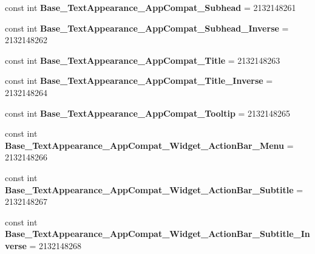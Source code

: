 \begin{DoxyCompactItemize}
\item 
\mbox{\label{classst_delivery_1_1_resource_1_1_style_a3ba1072d264f915f2ea480c4ac3f2675}} 
const int {\bfseries Base\+\_\+\+Text\+Appearance\+\_\+\+App\+Compat\+\_\+\+Subhead} = 2132148261
\item 
\mbox{\label{classst_delivery_1_1_resource_1_1_style_a83b7cdc42b468c067ec33a2ffac72bf6}} 
const int {\bfseries Base\+\_\+\+Text\+Appearance\+\_\+\+App\+Compat\+\_\+\+Subhead\+\_\+\+Inverse} = 2132148262
\item 
\mbox{\label{classst_delivery_1_1_resource_1_1_style_abcdab33e3cb05f960edd09c7cab39b3c}} 
const int {\bfseries Base\+\_\+\+Text\+Appearance\+\_\+\+App\+Compat\+\_\+\+Title} = 2132148263
\item 
\mbox{\label{classst_delivery_1_1_resource_1_1_style_a47932e3ee2c2fb7391d905f6e9c0e5da}} 
const int {\bfseries Base\+\_\+\+Text\+Appearance\+\_\+\+App\+Compat\+\_\+\+Title\+\_\+\+Inverse} = 2132148264
\item 
\mbox{\label{classst_delivery_1_1_resource_1_1_style_ae08ca5dc37900e68fa0c636225299f37}} 
const int {\bfseries Base\+\_\+\+Text\+Appearance\+\_\+\+App\+Compat\+\_\+\+Tooltip} = 2132148265
\item 
\mbox{\label{classst_delivery_1_1_resource_1_1_style_afb14513fed2de20cdc83cb8284a8b4a3}} 
const int {\bfseries Base\+\_\+\+Text\+Appearance\+\_\+\+App\+Compat\+\_\+\+Widget\+\_\+\+Action\+Bar\+\_\+\+Menu} = 2132148266
\item 
\mbox{\label{classst_delivery_1_1_resource_1_1_style_aedbcc77ff77dc5b00b39c5b713922eed}} 
const int {\bfseries Base\+\_\+\+Text\+Appearance\+\_\+\+App\+Compat\+\_\+\+Widget\+\_\+\+Action\+Bar\+\_\+\+Subtitle} = 2132148267
\item 
\mbox{\label{classst_delivery_1_1_resource_1_1_style_a0f10810a8034f1174738595cfb289fe0}} 
const int {\bfseries Base\+\_\+\+Text\+Appearance\+\_\+\+App\+Compat\+\_\+\+Widget\+\_\+\+Action\+Bar\+\_\+\+Subtitle\+\_\+\+Inverse} = 2132148268

\end{DoxyCompactItemize}
